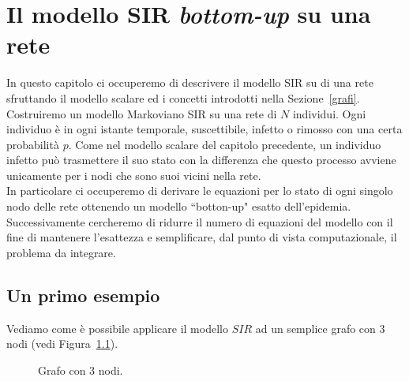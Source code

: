 \chapter{Il modello SIR \textit{bottom-up} su una rete}
In questo capitolo ci occuperemo di descrivere il modello SIR su di una rete sfruttando il modello scalare ed i concetti introdotti nella Sezione~\ref{grafi}. Costruiremo un modello Markoviano SIR su una rete di $N$ individui. Ogni individuo \`e in ogni istante temporale, suscettibile, infetto o rimosso con una certa probabilit\`a $p$. Come nel modello scalare del capitolo precedente, un individuo infetto pu\`o trasmettere il suo stato con la differenza che questo processo avviene unicamente per i nodi che sono suoi vicini nella rete.\\
In particolare ci occuperemo di derivare le equazioni per lo stato di ogni singolo nodo delle rete ottenendo un modello ``botton-up" esatto dell'epidemia. Successivamente cercheremo di ridurre il numero di equazioni del modello con il fine di mantenere l'esattezza e semplificare, dal punto di vista computazionale, il problema da integrare.  \section{Un primo esempio}
Vediamo come \`e possibile applicare il modello $SIR$ ad un semplice grafo con 3 nodi (vedi Figura~\ref{fig::3nodi}).\\
\begin{figure}[ht]
\centering
{}	
\caption{Grafo con 3 nodi.}
\label{fig::3nodi}
\end{figure}

